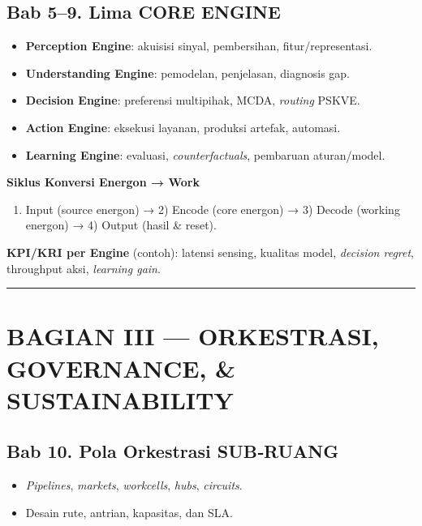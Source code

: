 \documentclass[
  letterpaper,
  DIV=11,
  numbers=noendperiod]{scrartcl}
\providecommand{\tightlist}{%
  \setlength{\itemsep}{0pt}\setlength{\parskip}{0pt}}
\begin{document}
\subsection{Bab 5--9. Lima CORE ENGINE}\label{bab-59.-lima-core-engine}

\begin{itemize}
\tightlist
\item
  \textbf{Perception Engine}: akuisisi sinyal, pembersihan,
  fitur/representasi.
\item
  \textbf{Understanding Engine}: pemodelan, penjelasan, diagnosis gap.
\item
  \textbf{Decision Engine}: preferensi multipihak, MCDA, \emph{routing}
  PSKVE.
\item
  \textbf{Action Engine}: eksekusi layanan, produksi artefak, automasi.
\item
  \textbf{Learning Engine}: evaluasi, \emph{counterfactuals}, pembaruan
  aturan/model.
\end{itemize}

\textbf{Siklus Konversi Energon → Work}

\begin{enumerate}
\def\labelenumi{\arabic{enumi}.}
\tightlist
\item
  Input (source energon) → 2) Encode (core energon) → 3) Decode (working
  energon) → 4) Output (hasil \& reset).
\end{enumerate}

\textbf{KPI/KRI per Engine} (contoh): latensi sensing, kualitas model,
\emph{decision regret}, throughput aksi, \emph{learning gain}.

\begin{center}\rule{0.5\linewidth}{0.5pt}\end{center}

\section{BAGIAN III --- ORKESTRASI, GOVERNANCE, \&
SUSTAINABILITY}\label{bagian-iii-orkestrasi-governance-sustainability}

\subsection{Bab 10. Pola Orkestrasi
SUB‑RUANG}\label{bab-10.-pola-orkestrasi-subruang}

\begin{itemize}
\tightlist
\item
  \emph{Pipelines}, \emph{markets}, \emph{workcells}, \emph{hubs},
  \emph{circuits}.
\item
  Desain rute, antrian, kapasitas, dan SLA.
\end{itemize}
\end{document}
